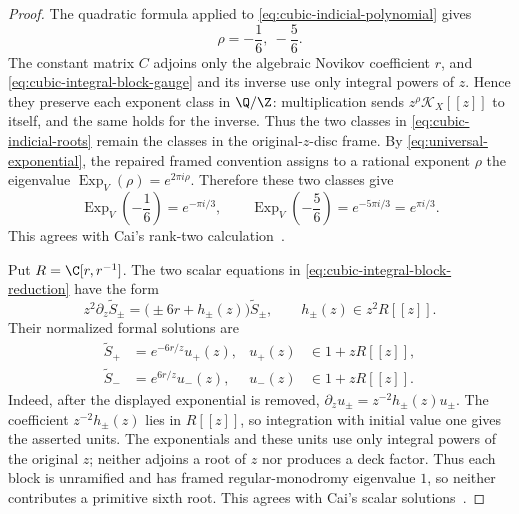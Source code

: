 \begin{proof}
The quadratic formula applied to \eqref{eq:cubic-indicial-polynomial} gives
\[
 \rho=-\frac16,\ -\frac56.
 \tag{4.9i}
 \label{eq:cubic-indicial-roots}
\]
The constant matrix \(C\) adjoins only the algebraic Novikov coefficient
\(r\), and \eqref{eq:cubic-integral-block-gauge} and its inverse use only
integral powers of \(z\).  Hence they preserve each exponent class in
\(\Q/\Z\): multiplication sends \(z^\rho\mathcal K_X[[z]]\) to itself, and the same
holds for the inverse.  Thus the two classes in
\eqref{eq:cubic-indicial-roots} remain the classes in the original-\(z\)-disc
frame.  By \eqref{eq:universal-exponential}, the repaired framed convention
assigns to a rational exponent \(\rho\) the eigenvalue
\(\operatorname{Exp}_V(\rho)=e^{2\pi i\rho}\).  Therefore these two classes
give
\[
 \operatorname{Exp}_V\left(-\frac16\right)=e^{-\pi i/3},
 \qquad
 \operatorname{Exp}_V\left(-\frac56\right)
 =e^{-5\pi i/3}=e^{\pi i/3}.
 \tag{4.9j}
 \label{eq:cubic-framed-eigenvalues}
\]
This agrees with Cai's rank-two calculation~\cite[p.~6]{Cai}.

Put \(R=\C[r,r^{-1}]\).  The two scalar equations in
\eqref{eq:cubic-integral-block-reduction} have the form
\[
 z^2\partial_z\widetilde S_\pm
 =\bigl(\pm6r+h_\pm(z)\bigr)\widetilde S_\pm,
 \qquad h_\pm(z)\in z^2R[[z]].
 \tag{4.9k}
 \label{eq:cubic-rank-one-scalar-equations}
\]
Their normalized formal solutions are
\[
 \begin{aligned}
 \widetilde S_+&=e^{-6r/z}u_+(z),
 &u_+(z)&\in1+zR[[z]],\\
 \widetilde S_-&=e^{6r/z}u_-(z),
 &u_-(z)&\in1+zR[[z]].
 \end{aligned}
 \tag{4.9l}
 \label{eq:cubic-rank-one-solutions}
\]
Indeed, after the displayed exponential is removed,
\(\partial_zu_\pm=z^{-2}h_\pm(z)u_\pm\).  The coefficient
\(z^{-2}h_\pm(z)\) lies in \(R[[z]]\), so integration with initial value
one gives the asserted units.  The exponentials and these units use only
integral powers of the original \(z\); neither adjoins a root of \(z\) nor
produces a deck factor.  Thus each block is unramified and has framed
regular-monodromy eigenvalue \(1\), so neither contributes a primitive sixth
root.  This agrees
with Cai's scalar solutions~\cite[pp.~5--6]{Cai}.


\end{proof}

